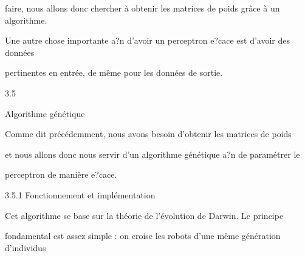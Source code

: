 \documentclass[a4paper,portrait,12pt]{article}
\begin{document}
\begin{flushleft}
faire, nous allons donc chercher \`{a} obtenir les matrices de poids gr\^{a}ce \`{a} un algorithme.
\end{flushleft}


\begin{flushleft}
Une autre chose importante a?n d'avoir un perceptron e?cace est d'avoir des donn\'{e}es
\end{flushleft}


\begin{flushleft}
pertinentes en entr\'{e}e, de m\^{e}me pour les donn\'{e}es de sortie.
\end{flushleft}


3.5





\begin{flushleft}
Algorithme g\'{e}n\'{e}tique
\end{flushleft}





\begin{flushleft}
Comme dit pr\'{e}c\'{e}demment, nous avons besoin d'obtenir les matrices de poids
\end{flushleft}


\begin{flushleft}
et nous allons donc nous servir d'un algorithme g\'{e}n\'{e}tique a?n de param\'{e}trer le
\end{flushleft}


\begin{flushleft}
perceptron de mani\`{e}re e?cace.
\end{flushleft}





\begin{flushleft}
3.5.1 Fonctionnement et impl\'{e}mentation
\end{flushleft}


\begin{flushleft}
Cet algorithme se base sur la th\'{e}orie de l'\'{e}volution de Darwin. Le principe
\end{flushleft}


\begin{flushleft}
fondamental est assez simple : on croise les robots d'une m\^{e}me g\'{e}n\'{e}ration d'individus
\end{flushleft}
\end{document}
